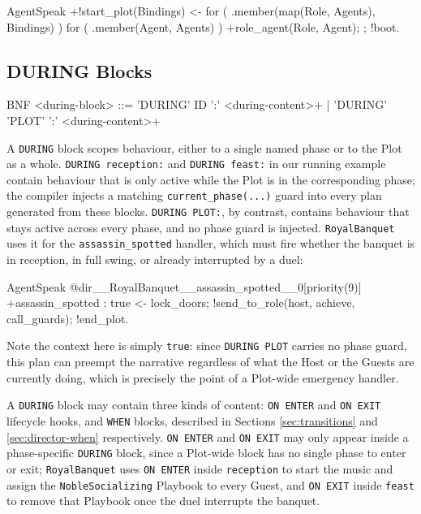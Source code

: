 \begin{codeblock}[]{AgentSpeak}
+!start_plot(Bindings) <-
    for ( .member(map(Role, Agents), Bindings) ) {
        for ( .member(Agent, Agents) ) {
            +role_agent(Role, Agent);
        }
    };
    !boot.
\end{codeblock}

\subsection{DURING Blocks}
\begin{codeblock}[]{BNF}
    <during-block>   ::= 'DURING' ID ':' <during-content>+
                       | 'DURING' 'PLOT' ':' <during-content>+
\end{codeblock}

A \lstinline|DURING| block scopes behaviour, either to a single named phase or to the Plot as a whole. \lstinline|DURING reception:| and \lstinline|DURING feast:| in our running example contain behaviour that is only active while the Plot is in the corresponding phase; the compiler injects a matching \lstinline|current_phase(...)| guard into every plan generated from these blocks. \lstinline|DURING PLOT:|, by contrast, contains behaviour that stays active across every phase, and no phase guard is injected. \lstinline|RoyalBanquet| uses it for the \lstinline|assassin_spotted| handler, which must fire whether the banquet is in reception, in full swing, or already interrupted by a duel:

\begin{codeblock}[]{AgentSpeak}
@dir__RoyalBanquet__assassin_spotted__0[priority(9)]
+assassin_spotted : true <-
    lock_doors;
    !send_to_role(host, achieve, call_guards);
    !end_plot.
\end{codeblock}

Note the context here is simply \lstinline|true|: since \lstinline|DURING PLOT| carries no phase guard, this plan can preempt the narrative regardless of what the Host or the Guests are currently doing, which is precisely the point of a Plot-wide emergency handler.

A \lstinline|DURING| block may contain three kinds of content: \lstinline|ON ENTER| and \lstinline|ON EXIT| lifecycle hooks, and \lstinline|WHEN| blocks, described in Sections \ref{sec:transitions} and \ref{sec:director-when} respectively. \lstinline|ON ENTER| and \lstinline|ON EXIT| may only appear inside a phase-specific \lstinline|DURING| block, since a Plot-wide block has no single phase to enter or exit; \lstinline|RoyalBanquet| uses \lstinline|ON ENTER| inside \lstinline|reception| to start the music and assign the \lstinline|NobleSocializing| Playbook to every Guest, and \lstinline|ON EXIT| inside \lstinline|feast| to remove that Playbook once the duel interrupts the banquet.

